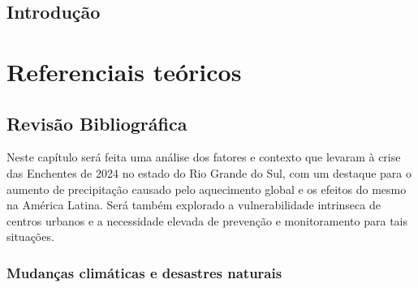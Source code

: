 \documentclass[
	12pt,				%
	openright,			%
	twoside,			%
	a4paper,			%
	english,			%
	french,				%
	spanish,			%
	brazil				%
	]{abntex2}
\begin{document}

\tableofcontents*
\cleardoublepage

\textual

\chapter{Introdução}


\part{Referenciais teóricos}

\chapter{Revisão Bibliográfica}
  Neste capítulo será feita uma análise dos fatores e contexto que levaram à crise das Enchentes de 2024 no estado do
  Rio Grande do Sul, com um destaque para o aumento de precipitação causado pelo aquecimento global e os efeitos do
  mesmo na América Latina. Será também explorado a vulnerabilidade intrinseca de centros urbanos e a necessidade elevada
  de prevenção e monitoramento para tais situações.
    \section{Mudanças climáticas e desastres naturais}
    
\end{document}
